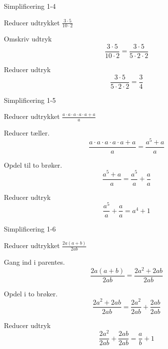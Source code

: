 \documentclass{article}
\begin{document}
\newpage

\begin{exercise}{Simplificering 1-4}

Reducer udtrykket $\frac{3 \cdot 5}{10 \cdot 2}$


\hint

Omskriv udtryk
\[
\frac{3 \cdot 5}{10 \cdot 2} =  \frac{3 \cdot 5}{5 \cdot 2 \cdot 2}
\]

\hint

Reducer udtryk
\[
\frac{3 \cdot 5}{5 \cdot 2 \cdot 2} = \frac{3}{4}
\]



\end{exercise}

\newpage

\begin{exercise}{Simplificering 1-5}

Reducer udtrykket $\frac{a \cdot a \cdot a \cdot a \cdot a + a}{a}$


\hint

Reducer tæller.
\[
\frac{a \cdot a \cdot a \cdot a \cdot a + a}{a}  = \frac{a^5+a}{a}
\]

\hint 

Opdel  til to brøker.
\[
\frac{a^5+a}{a} = \frac{a^5}{a} + \frac{a}{a}
\]

\hint

Reducer udtryk 
\[
\frac{a^5}{a} + \frac{a}{a} = a^4 + 1
\]

\end{exercise}

\newpage

\begin{exercise}{Simplificering 1-6}

Reducer udtrykket $\frac{2a(a+b)}{2ab}$


\hint

Gang ind i parentes.
\[
\frac{2a(a+b)}{2ab} = \frac{2a^2 + 2ab}{2ab}
\]

\hint

Opdel i to brøker.
\[
\frac{2a^2 + 2ab}{2ab} = \frac{2a^2}{2ab} + \frac{2ab}{2ab}
\]


\hint

Reducer udtryk 
\[
\frac{2a^2}{2ab} + \frac{2ab}{2ab} = \frac{a}{b} + 1
\]

\end{exercise}
\end{document}
